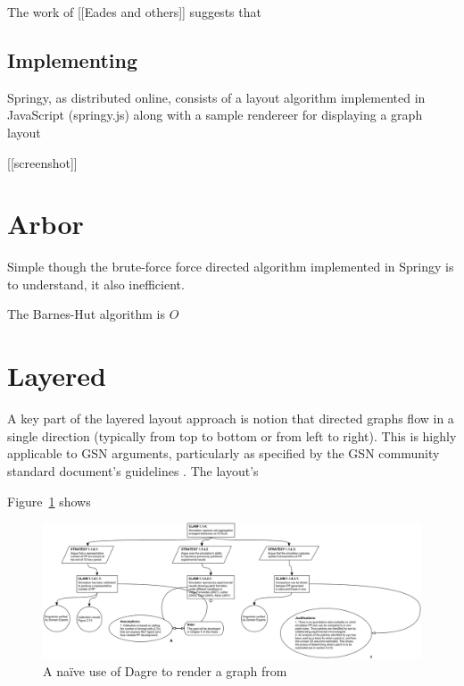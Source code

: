 The work of [[Eades and others]] suggests that

\subsection{Implementing }

Springy, as distributed online, consists of a layout algorithm implemented in JavaScript (springy.js) along with a sample rendereer for displaying a graph layout 

[[screenshot]]



\section{Arbor}

Simple though the brute-force force directed algorithm implemented in Springy is to understand, it also inefficient.

The Barnes-Hut algorithm is $O$



\section{Layered}

A key part of the layered layout approach is notion that directed graphs flow in a single direction (typically from top to bottom or from left to right). This is highly applicable to GSN arguments, particularly as specified by the GSN community standard document's guidelines \cite{gsnstandard}. The layout's 





Figure~\ref{fig:dagre1} shows

\begin{figure}
  \centering
  \includegraphics[width=\textwidth]{graphics/results/dagre.png}
  \caption{A na\"ive use of Dagre to render a graph from \cite{aldenthesis}}
  \label{fig:dagre1}
\end{figure}



